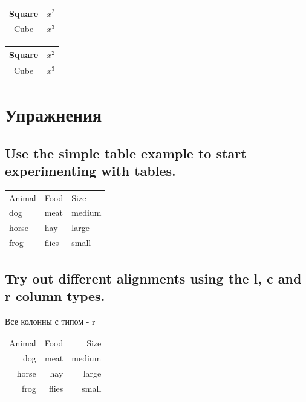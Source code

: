 \documentclass{article}
\begin{document}
  \smallskip

\begin{center}
\begin{tabular}{cc}
\hline
Square& $x^2$\\
\hline
Cube& $x^3$\\
\hline
\end{tabular}
\end{center}
\begin{center}
\setlength\extrarowheight{2pt}
\begin{tabular}{cc}
\hline
Square& $x^2$\\
\hline
Cube& $x^3$\\
\hline
\end{tabular}
\end{center}



  \section{Упражнения}
  \label{sec:ex}

  \subsection{Use the simple table example to start experimenting with tables.}
  \label{subsec:width}

  \begin{tabular}{lll}
    Animal & Food & Size \\
    dog & meat & medium \\
    horse & hay & large \\
    frog & flies & small \\
  \end{tabular}



  \subsection{Try out different alignments using the l, c and r column types.}
  \label{subsec:width}

  Все колонны с типом - r
     \smallskip
  \begin{tabular}{rrr}
    Animal & Food & Size \\
    dog & meat & medium \\
    horse & hay & large \\
    frog & flies & small \\
  \end{tabular}
\end{document}
